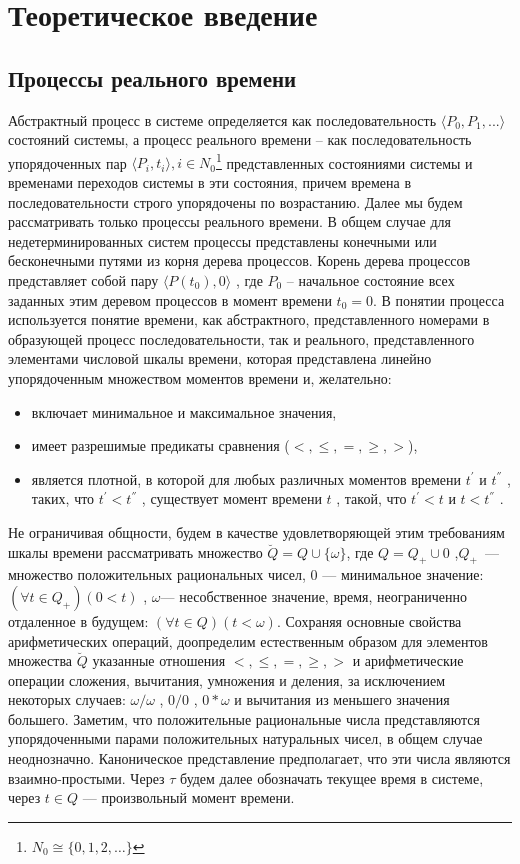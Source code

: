 \chapter{Теоретическое введение}
\section{Процессы реального времени}
Абстрактный процесс в системе определяется как последовательность $ \langle P_0,P_1,...\rangle $   состояний системы, а процесс реального времени – как последовательность упорядоченных пар $ \langle P_i,t_i \rangle, i\in N_0 $\footnote{$ N_0 \cong \{0,1,2,\dots\}$} представленных состояниями системы и временами переходов системы в эти состояния, причем времена в последовательности строго упорядочены по возрастанию. 
Далее мы будем рассматривать только процессы реального времени. 
В общем случае для недетерминированных систем процессы представлены конечными или бесконечными путями из корня дерева процессов.
Корень дерева процессов представляет собой пару $ \langle P(t_0),0 \rangle $ , где $ P_0 $  – начальное состояние всех заданных этим деревом процессов в момент времени  $ t_0 = 0 $. 
В понятии процесса используется понятие времени, как абстрактного, представленного номерами в образующей процесс последовательности, так и реального, представленного элементами числовой шкалы времени, которая представлена линейно упорядоченным множеством моментов времени и, желательно: 
\begin{itemize}
	\item включает минимальное и максимальное значения, 
	\item имеет разрешимые предикаты сравнения ($ <,\leq,=,\geq, > $),
	\item является плотной, в которой для любых различных моментов времени $ t^{'} $  и $ t^{''} $  , таких, что $ t^{'}<t^{''} $ , существует момент времени $ t $ , такой, что  $ t^{'}<t $  и $ t<t^{''} $ .
\end{itemize}

Не ограничивая общности, будем в качестве удовлетворяющей этим требованиям шкалы времени рассматривать множество $ \breve{Q} = Q \cup \{\omega\} $, где $ Q=Q_+\cup{0} $ ,$ Q_+ $~--- множество положительных рациональных чисел, $ 0 $ --- минимальное значение:$ (\forall t \in Q_+) (0<t) $ , $ \omega $--- несобственное значение, время, неограниченно отдаленное в будущем: $ (\forall t \in Q) (t<\omega) $. 
Сохраняя основные свойства арифметических операций, доопределим естественным образом для элементов множества $ \breve{Q} $ указанные отношения $ <,\leq,=,\geq, > $ и арифметические операции сложения, вычитания, умножения и деления, за исключением некоторых случаев: $ \omega/\omega $ , $ 0/0 $ , $ 0*\omega $  и вычитания из меньшего значения большего. 
Заметим, что положительные рациональные числа представляются упорядоченными парами положительных натуральных чисел, в общем случае неоднозначно. Каноническое представление предполагает, что эти числа являются взаимно-простыми. Через $ \tau $   будем далее обозначать текущее время в системе, через $ t\in Q $  --- произвольный момент времени.  

